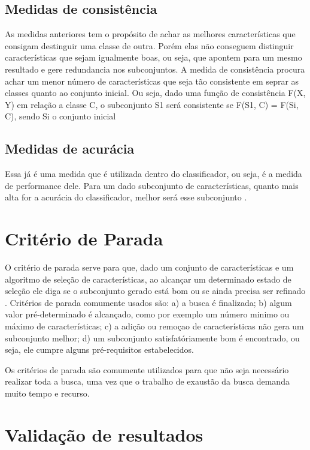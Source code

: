 \subsection{Medidas de consistência}

As medidas anteriores tem o propósito de achar as melhores características que consigam destinguir uma classe de outra. Porém elas não conseguem distinguir características que sejam igualmente boas, ou seja, que apontem para um mesmo resultado e gere redundancia nos subconjuntos. A medida de consistência procura achar um menor número de características que seja tão consistente em seprar as classes quanto ao conjunto inicial. Ou seja, dado uma função de consistência F(X, Y) em relação a classe C, o subconjunto S1 será consistente se F(S1, C) = F(Si, C), sendo Si o conjunto inicial \cite{liu_2005}

\subsection{Medidas de acurácia}

Essa já é uma medida que é utilizada dentro do classificador, ou seja, é a medida de performance dele. Para um dado subconjunto de características, quanto mais alta for a acurácia do classificador, melhor será esse subconjunto \cite{huan_1998}.

\section{Critério de Parada}

O critério de parada serve para que, dado um conjunto de características e um algoritmo de seleção de características, ao alcançar um determinado estado de seleção ele diga se o subconjunto gerado está bom ou se ainda precisa ser refinado \cite{dash_1997}. Critérios de parada comumente usados são: a) a busca é finalizada; b) algum valor pré-determinado é alcançado, como por exemplo um número minimo ou máximo de características; c) a adição ou remoçao de características não gera um subconjunto melhor; d) um subconjunto satisfatóriamente bom é encontrado, ou seja, ele cumpre alguns pré-requisitos estabelecidos.

Os critérios de parada são comumente utilizados para que não seja necessário realizar toda a busca, uma vez que o trabalho de exaustão da busca demanda muito tempo e recurso.

\section{Validação de resultados}

